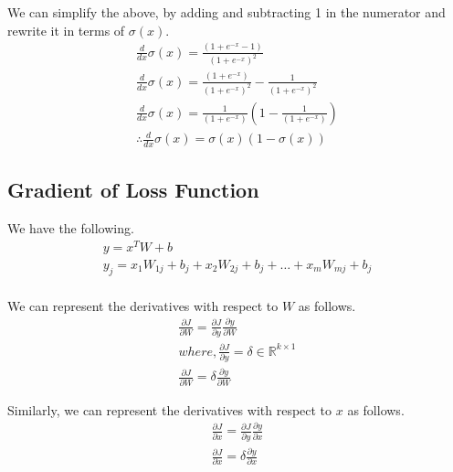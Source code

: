 \documentclass[a4paper]{article}
\begin{document}
We can simplify the above, by adding and subtracting 1 in the numerator and rewrite it in terms of $\sigma(x)$.
\begin{equation}
\begin{gathered}
    \frac { d } { d x } \sigma ( x ) = \frac { \left( 1 + e ^ { - x } - 1 \right) } { \left( 1 + e ^ { - x } \right) ^ { 2 } } \\ 
    \frac { d } { d x } \sigma ( x ) = \frac { \left( 1 + e ^ { - x } \right) } { \left( 1 + e ^ { - x } \right) ^ { 2 } } - \frac { 1 } { \left( 1 + e ^ { - x } \right) ^ { 2 } } \\
    \frac { d } { d x } \sigma ( x ) = \frac { 1 } { \left( 1 + e ^ { - x } \right) } \left( 1 - \frac { 1 } { \left( 1 + e ^ { - x } \right) } \right) \\
    \therefore \frac { d } { d x } \sigma ( x ) = \sigma(x) (1-\sigma(x))
\end{gathered}
\end{equation}

\subsection{Gradient of Loss Function}
We have the following.
\begin{equation}
\begin{gathered}
    y = x ^ { T } W + b \\
    y_{j} = x _ { 1 } W _ { 1 j } + b _ { j }  + x _ { 2 } W _ { 2 j } + b _ { j } + \dots + x _ { m } W _ { m j } + b _ { j }\\
\end{gathered}
\end{equation}

We can represent the derivatives with respect to $W$ as follows.
\begin{equation}
\begin{gathered}
    \frac { \partial J } { \partial W } = \frac { \partial J } { \partial y } \frac { \partial y } { \partial W } \\
    where, \frac { \partial J } { \partial y } = \delta \in \mathbb { R } ^ { k \times 1 } \\
    \frac { \partial J } { \partial W } = \delta \frac { \partial y } { \partial W }
\end{gathered}
\end{equation}

Similarly, we can represent the derivatives with respect to $x$ as follows.
\begin{equation}
\begin{gathered}
    \frac { \partial J } { \partial x } = \frac { \partial J } { \partial y } \frac { \partial y } { \partial x } \\
    \frac { \partial J } { \partial x } = \delta \frac { \partial y } { \partial x }
\end{gathered}
\end{equation}
\end{document}
